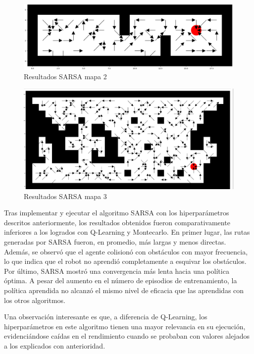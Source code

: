 \documentclass[conference,a4paper]{IEEEtran}
\begin{document}
\begin{figure}[h]
  \centering
  \includegraphics[scale=0.33]{resultado_sarsa_mapa_2}
  \caption{Resultados SARSA mapa 2}
  \label{fig:resultado_sarsa_mapa_2}
\end{figure}

\begin{figure}[h]
  \centering
  \includegraphics[scale=0.33]{resultado_sarsa_mapa_3}
  \caption{Resultados SARSA mapa 3}
  \label{fig:resultado_sarsa_mapa_3}
\end{figure}

Tras implementar y ejecutar el algoritmo SARSA con los hiperparámetros descritos anteriormente, los resultados obtenidos fueron comparativamente inferiores a los logrados con Q-Learning y Montecarlo. 
En primer lugar, las rutas generadas por SARSA fueron, en promedio, más largas y menos directas. Además, se observó que el agente colisionó con obstáculos con mayor frecuencia, lo que indica que el robot no aprendió completamente a esquivar los obstáculos. Por último, SARSA mostró una convergencia más lenta hacia una política óptima. 
A pesar del aumento en el número de episodios de entrenamiento, la política aprendida no alcanzó el mismo nivel de eficacia que las aprendidas con los otros algoritmos.\newline

Una observación interesante es que, a diferencia de Q-Learning, los hiperparámetros en este algoritmo tienen una mayor relevancia en su ejecución, evidenciándose caídas en el rendimiento cuando se probaban con valores alejados a los explicados con anterioridad.
\end{document}

